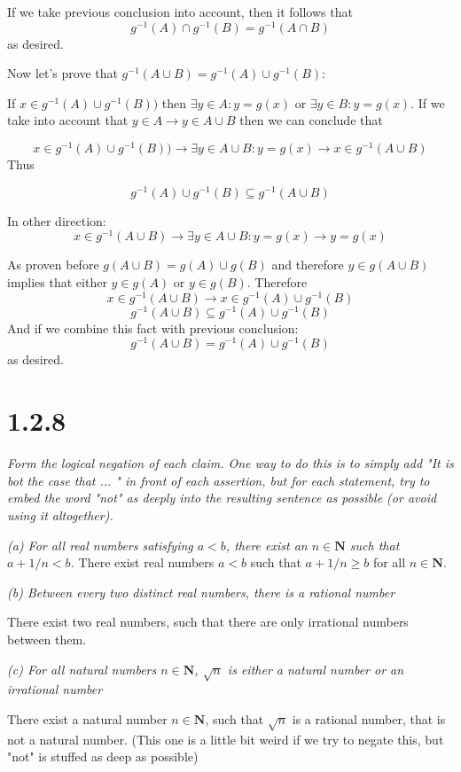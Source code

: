 \documentclass[11pt,oneside,titlepage]{article}
\begin{document}
If we take previous conclusion into account, then it follows that
$$ g^{-1}(A) \cap g^{-1}(B) = g^{-1}(A \cap B)$$
as desired.

Now let's prove that  $g^{-1}(A \cup B) = g^{-1}(A) \cup g^{-1}(B)$:


If $ x \in g^{-1}(A) \cup g^{-1}(B))$ then  $\exists y \in A: y = g(x)$ or
$\exists y \in B: y = g(x)$. If we take into account that $y \in A \to y \in A \cup B$ then we can conclude that

$$ x \in g^{-1}(A) \cup g^{-1}(B)) \to \exists y \in A \cup B : y = g(x) \to
x \in g^{-1}(A \cup B)$$
Thus

$$g^{-1}(A) \cup g^{-1}(B) \subseteq g^{-1}(A \cup B)$$

In other direction: 
$$x \in g^{-1}(A \cup B) \to \exists y \in A \cup B: y = g(x) \to y = g(x)$$

As proven before $g(A \cup B) = g(A) \cup g(B)$ and therefore
$y \in g(A \cup B)$ implies that either $y \in g(A)$ or $y \in g(B)$. Therefore
$$ x \in g^{-1}(A \cup B) \to x \in g^{-1}(A) \cup g^{-1}(B)$$
$$ g^{-1}(A \cup B)  \subseteq g^{-1}(A) \cup g^{-1}(B)$$
And if we combine this fact with previous conclusion:
$$ g^{-1}(A \cup B) =  g^{-1}(A) \cup g^{-1}(B)$$
as desired.

\section*{1.2.8}

\textit{Form the logical negation of each claim. One way to do this is to
  simply add "It is bot the case that ... " in front of each assertion, but for
  each statement, try to embed the word "not" as deeply into the resulting
  sentence as possible (or avoid using it altogether).}

\textit{(a) For all real numbers satisfying $a < b$, there exist an $n \in
  \textbf{N}$ such that $a + 1/n < b$.}
There exist real numbers $a < b$ such that $a + 1/n \geq b$ for all $n \in \textbf{N}$.

\textit{(b) Between every two distinct real numbers, there is a rational number}

There exist two real numbers, such that there are only irrational numbers
between them.

\textit{(c) For all natural numbers $n \in \textbf{N}$, $\sqrt{n}$ is either a
  natural number  or an irrational number}

There exist a natural number $n \in \textbf{N}$, such that $\sqrt{n}$ is a
rational number, that is not a natural number. (This one is a little bit weird
if we try to negate this, but "not" is stuffed as deep as possible)
\end{document}
